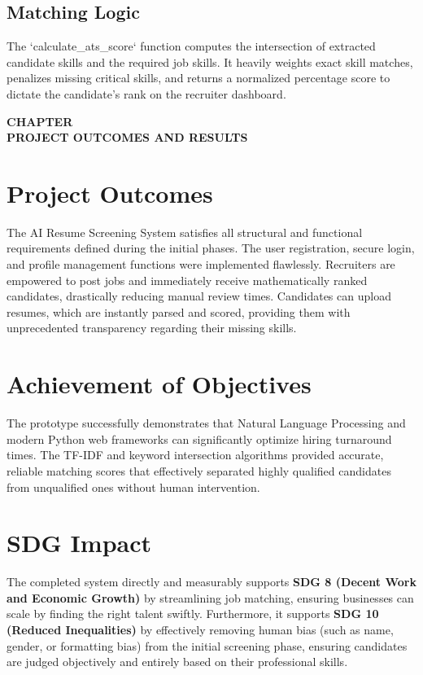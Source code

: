 \documentclass[12pt,a4paper]{report}
\newcommand{\chaptertitlepage}[1]{%
\cleardoublepage
\thispagestyle{empty}
\null
\vfill
\begin{center}
{\fontsize{16pt}{18pt}\selectfont\bfseries
CHAPTER \thechapter}\\[0.5cm]
{\fontsize{16pt}{18pt}\selectfont\bfseries
#1}
\end{center}
\vfill
\null
\clearpage
}
\begin{document}
\subsection{Matching Logic}
The `calculate_ats_score` function computes the intersection of extracted candidate skills and the required job skills. It heavily weights exact skill matches, penalizes missing critical skills, and returns a normalized percentage score to dictate the candidate's rank on the recruiter dashboard.

\chaptertitlepage{PROJECT OUTCOMES AND RESULTS}
\section{Project Outcomes}
The AI Resume Screening System satisfies all structural and functional requirements defined during the initial phases. The user registration, secure login, and profile management functions were implemented flawlessly. Recruiters are empowered to post jobs and immediately receive mathematically ranked candidates, drastically reducing manual review times. Candidates can upload resumes, which are instantly parsed and scored, providing them with unprecedented transparency regarding their missing skills.

\section{Achievement of Objectives}
The prototype successfully demonstrates that Natural Language Processing and modern Python web frameworks can significantly optimize hiring turnaround times. The TF-IDF and keyword intersection algorithms provided accurate, reliable matching scores that effectively separated highly qualified candidates from unqualified ones without human intervention.

\section{SDG Impact}
The completed system directly and measurably supports \textbf{SDG 8 (Decent Work and Economic Growth)} by streamlining job matching, ensuring businesses can scale by finding the right talent swiftly. Furthermore, it supports \textbf{SDG 10 (Reduced Inequalities)} by effectively removing human bias (such as name, gender, or formatting bias) from the initial screening phase, ensuring candidates are judged objectively and entirely based on their professional skills.
\end{document}
